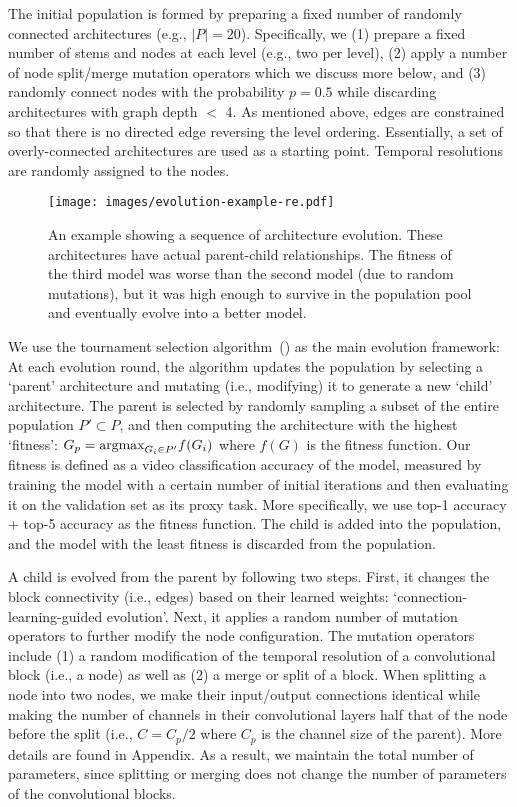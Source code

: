 \documentclass{article} \usepackage{iclr2020_conference,times}
\begin{document}
The initial population is formed by preparing a fixed number of randomly connected architectures (e.g., $|P|=20$). Specifically, we (1) prepare a fixed number of stems and nodes at each level (e.g., two per level), (2) apply a number of node split/merge mutation operators which we discuss more below, and (3) randomly connect nodes with the probability $p=0.5$ while discarding architectures with graph depth $<$ 4. As mentioned above, edges are constrained so that there is no directed edge reversing the level ordering. Essentially, a set of overly-connected architectures are used as a starting point. Temporal resolutions are randomly assigned to the nodes.

\begin{figure}
  \centering
\texttt{[image: images/evolution-example-re.pdf]}\caption{An example showing a sequence of architecture evolution. These architectures have  actual parent-child relationships. The fitness of the third model was worse than the second model (due to random mutations), but it was high enough to survive in the population pool and eventually evolve into a better model.}
  \label{fig:evolution-example}
\end{figure}




We use the tournament selection algorithm~(\citealp{goldberg91acomparative}) as the main evolution framework: At each evolution round, the algorithm updates the population by selecting a `parent' architecture and mutating (i.e., modifying) it to generate a new `child' architecture. The parent is selected by randomly sampling a subset of the entire population $P' \subset P$, and then computing the architecture with the highest `fitness': $G_p = \textnormal{argmax}_{G_i \in P'} f(G_i)$ where $f(G)$ is the fitness function. Our fitness is defined as a video classification accuracy of the model, measured by training the model with a certain number of initial iterations and then evaluating it on the validation set as its proxy task. More specifically, we use top-1 accuracy + top-5 accuracy as the fitness function. The child is added into the population, and the model with the least fitness is discarded from the population.

A child is evolved from the parent by following two steps. First, it changes the block connectivity (i.e., edges) based on their learned weights: `connection-learning-guided evolution'. Next, it applies a random number of mutation operators to further modify the node configuration. The mutation operators include (1) a random modification of the temporal resolution of a convolutional block (i.e., a node) as well as (2) a merge or split of a block. 
When splitting a node into two nodes, we make their input/output connections identical while making the number of channels in their convolutional layers half that of the node before the split (i.e., $C = C_p / 2$ where $C_p$ is the channel size of the parent). More details are found in Appendix. As a result, we maintain the total number of parameters, since splitting or merging does not change the number of parameters of the convolutional blocks.
\end{document}
